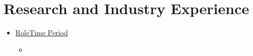 \section{Research and Industry Experience}
\begin{itemize}
      \item {}
            {\underline{Role}}{\underline{Time Period}}
            \begin{itemize}
                  \item {}
            \end{itemize}
\end{itemize}